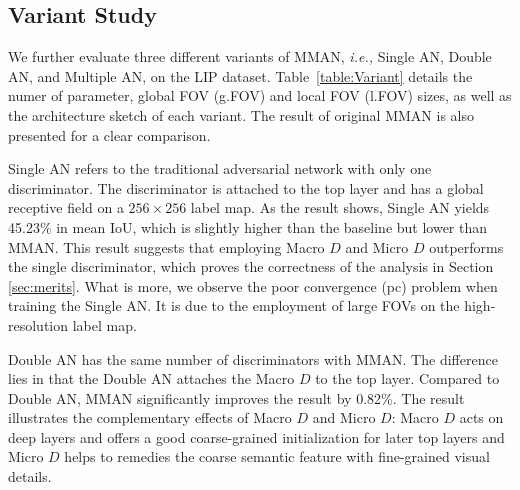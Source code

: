 \documentclass[runningheads]{llncs}
\begin{document}
\iffalse
\begin{figure}[t]
\centering
\texttt{[image: Failure\_cases]}
\caption{The failure cases generated by MMAN. In summary, we discover four kinds of conditions leading to the most of failing parsing result:
\textbf{(a)} Label conflict, \emph{e.g.,} the dress can be explained as an upper-cloth and a skirt. It can fool our discriminators, since the global structure as well as the local distribution are reasonable.
\textbf{(b)} Complex texture, \emph{e.g.,} the various of costumes may conceal the obvious structural features of the human body.
\textbf{(c)} Rare poses, \emph{e.g.,} the man fall. One of his leg is in the top of the image when his arms are close to the bottom.
\textbf{(d)} Scale varying. It is common in the Pascal-Person-Part dataset. Although the attention network~\cite{chen2016attention} alleviates this effect, we observe some failure cases in hard examples with very small human.}
\label{fig:failure}
\end{figure}
\fi

\subsection{Variant Study}\label{Variant}
We further evaluate three different variants of MMAN, \emph{i.e.,} Single AN, Double AN, and Multiple AN, on the LIP dataset. Table~\ref{table:Variant} details the numer of parameter, global FOV (g.FOV) and local FOV (l.FOV) sizes, as well as the architecture sketch of each variant. The result of original MMAN is also presented for a clear comparison.

Single AN refers to the traditional adversarial network with only one discriminator. The discriminator is attached to the top layer and has a global receptive field on a $256\times256$ label map. As the result shows, Single AN yields 45.23\% in mean IoU, which is slightly higher than the baseline but lower than MMAN. This result suggests that employing Macro $D$ and Micro $D$ outperforms the single discriminator, which proves the correctness of the analysis in Section \ref{sec:merits}. What is more, we observe the poor convergence (pc) problem when training the Single AN. It is due to the employment of large FOVs on the high-resolution label map.

Double AN has the same number of discriminators with MMAN. The difference lies in that the Double AN attaches the Macro $D$ to the top layer. Compared to Double AN, MMAN significantly improves the result by 0.82\%. The result illustrates the complementary effects of Macro $D$ and Micro $D$: Macro $D$ acts on deep layers and offers a good coarse-grained initialization for later top layers and Micro $D$ helps to remedies the coarse semantic feature with fine-grained visual details. 
\end{document}
